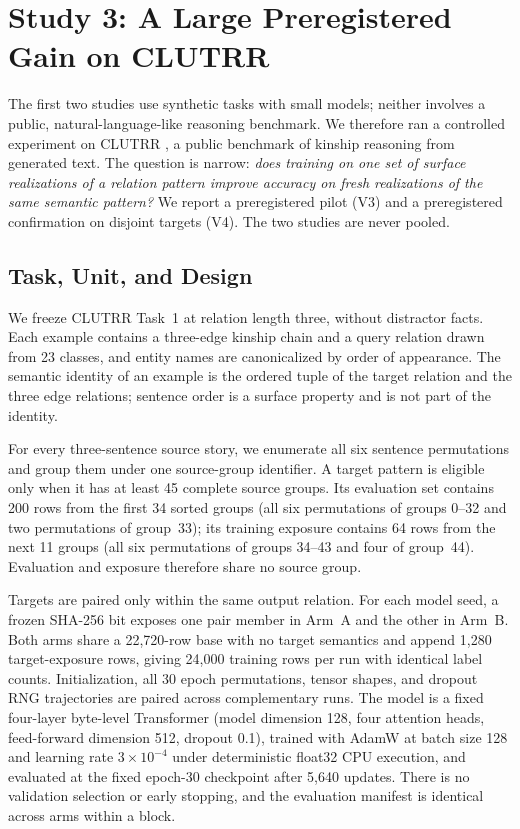 \section{Study 3: A Large Preregistered Gain on CLUTRR}
\label{sec:clutrr-external-validation}

The first two studies use synthetic tasks with small models; neither
involves a public, natural-language-like reasoning benchmark.  We therefore
ran a controlled experiment on CLUTRR \cite{sinha2019clutrr}, a public
benchmark of kinship reasoning from generated text.  The question is
narrow: \emph{does training on one set of surface realizations of a
relation pattern improve accuracy on fresh realizations of the same
semantic pattern?}  We report a preregistered pilot (V3) and a
preregistered confirmation on disjoint targets (V4).  The two studies are
never pooled.

\subsection{Task, Unit, and Design}

We freeze CLUTRR Task~1 at relation length three, without distractor facts.
Each example contains a three-edge kinship chain and a query relation drawn
from 23 classes, and entity names are canonicalized by order of appearance.
The semantic identity of an example is the ordered tuple of the target
relation and the three edge relations; sentence order is a surface property
and is not part of the identity.

For every three-sentence source story, we enumerate all six sentence
permutations and group them under one source-group identifier.  A target
pattern is eligible only when it has at least 45 complete source groups.
Its evaluation set contains 200 rows from the first 34 sorted groups (all
six permutations of groups 0--32 and two permutations of group~33); its
training exposure contains 64 rows from the next 11 groups (all six
permutations of groups 34--43 and four of group~44).  Evaluation and
exposure therefore share no source group.

Targets are paired only within the same output relation.  For each model
seed, a frozen SHA-256 bit exposes one pair member in Arm~A and the other
in Arm~B.  Both arms share a 22,720-row base with no target semantics and
append 1,280 target-exposure rows, giving 24,000 training rows per run with
identical label counts.  Initialization, all 30 epoch permutations, tensor
shapes, and dropout RNG trajectories are paired across complementary runs.
The model is a fixed four-layer byte-level Transformer (model dimension
128, four attention heads, feed-forward dimension 512, dropout 0.1),
trained with AdamW at batch size 128 and learning rate $3\times10^{-4}$
under deterministic float32 CPU execution, and evaluated at the fixed
epoch-30 checkpoint after 5,640 updates.  There is no validation selection
or early stopping, and the evaluation manifest is identical across arms
within a block.

